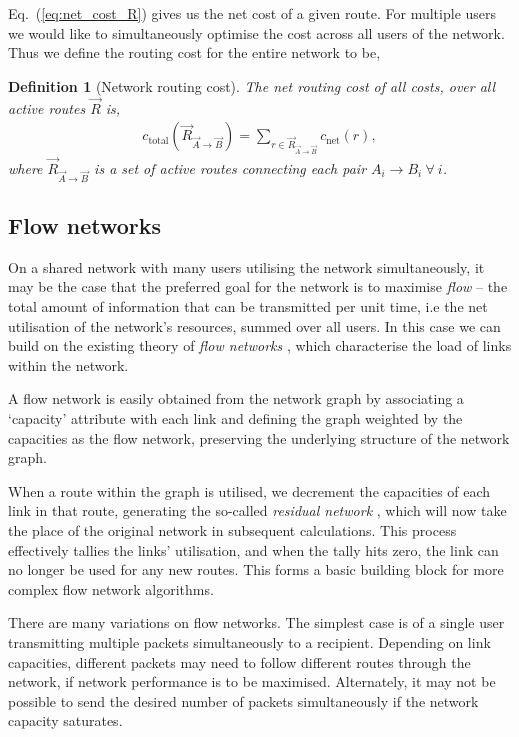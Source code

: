 \documentclass[aps, rmp, twocolumn, amsmath, amssymb, nofootinbib, superscriptaddress, longbibliography, floatfix, table-of-contents, eqsecnum]{revtex4-1}
\newtheorem{definition}{Definition}
\begin{document}
Eq.~(\ref{eq:net_cost_R}) gives us the net cost of a given route. For multiple users we would like to simultaneously optimise the cost across all users of the network. Thus we define the routing cost for the entire network to be,
\begin{definition}[Network routing cost]
	The net routing cost of all costs, over all active routes $\vec{R}$ is,
\begin{align} \label{eq:c_total}
c_\text{total}(\vec{R}_{\vec{A}\to \vec{B}}) = \sum_{r \in {\vec R}_{\vec{A}\to \vec{B}}} c_\text{net}(r),
\end{align}
where $\vec{R}_{\vec{A}\to \vec{B}}$ is a set of active routes connecting each pair \mbox{$A_i\to B_i~\forall ~ i$}.
\end{definition}

%
%

\subsection{Flow networks} \label{sec:flow_networks} 

On a shared network with many users utilising the network simultaneously, it may be the case that the preferred goal for the network is to maximise \textit{flow} \cite{???} -- the total amount of information that can be transmitted per unit time, i.e the net utilisation of the network's resources, summed over all users. In this case we can build on the existing theory of \textit{flow networks} \cite{???}, which characterise the load of links within the network.

A flow network is easily obtained from the network graph by associating a `capacity' attribute with each link and defining the graph weighted by the capacities as the flow network, preserving the underlying structure of the network graph.

When a route within the graph is utilised, we decrement the capacities of each link in that route, generating the so-called \textit{residual network} \cite{???}, which will now take the place of the original network in subsequent calculations. This process effectively tallies the links' utilisation, and when the tally hits zero, the link can no longer be used for any new routes. This forms a basic building block for more complex flow network algorithms.

There are many variations on flow networks. The simplest case is of a single user transmitting multiple packets simultaneously to a recipient. Depending on link capacities, different packets may need to follow different routes through the network, if network performance is to be maximised. Alternately, it may not be possible to send the desired number of packets simultaneously if the network capacity saturates.
\end{document}
